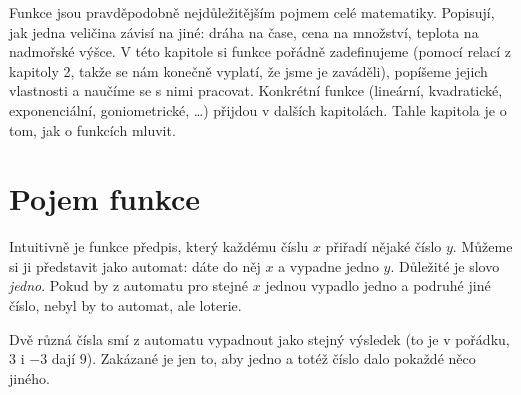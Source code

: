 \label{kap:funkce}

Funkce jsou pravděpodobně nejdůležitějším pojmem celé matematiky. Popisují, jak jedna veličina závisí na jiné: dráha na čase, cena na množství, teplota na nadmořské výšce. V této kapitole si funkce pořádně zadefinujeme (pomocí relací z kapitoly 2, takže se nám konečně vyplatí, že jsme je zaváděli), popíšeme jejich vlastnosti a naučíme se s nimi pracovat. Konkrétní funkce (lineární, kvadratické, exponenciální, goniometrické, \ldots) přijdou v dalších kapitolách. Tahle kapitola je o tom, jak o funkcích mluvit.

\section{Pojem funkce}\label{sec:pojem-funkce}

Intuitivně je funkce předpis, který každému číslu $x$ přiřadí nějaké číslo $y$. Můžeme si ji představit jako automat: dáte do něj $x$ a vypadne jedno $y$. Důležité je slovo \textit{jedno}. Pokud by z automatu pro stejné $x$ jednou vypadlo jedno a podruhé jiné číslo, nebyl by to automat, ale loterie.

\begin{center}
\end{center}

Dvě různá čísla smí z automatu vypadnout jako stejný výsledek (to je v pořádku, $3$ i $-3$ dají $9$). Zakázané je jen to, aby jedno a totéž číslo dalo pokaždé něco jiného.

